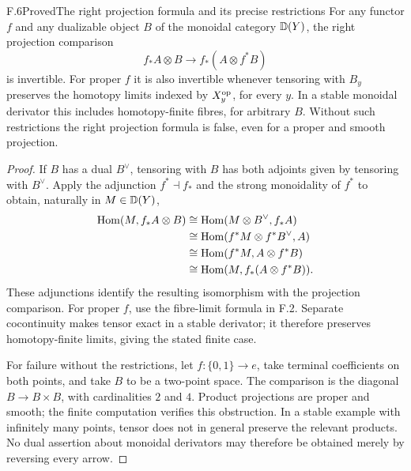 \begin{claim}{F.6}{Proved}{The right projection formula and its precise restrictions}
For any functor $f$ and any dualizable object $B$ of the monoidal category $\mathbb D(Y)$, the right projection comparison
\[
 f_*A\otimes B\longrightarrow f_*(A\otimes f^*B)
\]
is invertible. For proper $f$ it is also invertible whenever tensoring with $B_y$ preserves the homotopy limits indexed by $X_y^{\mathrm{op}}$, for every $y$. In a stable monoidal derivator this includes homotopy-finite fibres, for arbitrary $B$. Without such restrictions the right projection formula is false, even for a proper and smooth projection.
\end{claim}
\begin{proof}
If $B$ has a dual $B^\vee$, tensoring with $B$ has both adjoints given by tensoring with $B^\vee$. Apply the adjunction $f^*\dashv f_*$ and the strong monoidality of $f^*$ to obtain, naturally in $M\in\mathbb D(Y)$,
\begin{align*}
 \mathrm{Hom}(M,f_*A\otimes B)
 &\cong\mathrm{Hom}(M\otimes B^\vee,f_*A)\\
 &\cong\mathrm{Hom}(f^*M\otimes f^*B^\vee,A)\\
 &\cong\mathrm{Hom}(f^*M,A\otimes f^*B)\\
 &\cong\mathrm{Hom}(M,f_*(A\otimes f^*B)).
\end{align*}
These adjunctions identify the resulting isomorphism with the projection comparison. For proper $f$, use the fibre-limit formula in F.2. Separate cocontinuity makes tensor exact in a stable derivator; it therefore preserves homotopy-finite limits, giving the stated finite case.

For failure without the restrictions, let $f:\{0,1\}\to e$, take terminal coefficients on both points, and take $B$ to be a two-point space. The comparison is the diagonal $B\to B\times B$, with cardinalities $2$ and $4$. Product projections are proper and smooth; the finite computation verifies this obstruction. In a stable example with infinitely many points, tensor does not in general preserve the relevant products. No dual assertion about monoidal derivators may therefore be obtained merely by reversing every arrow.
\end{proof}

